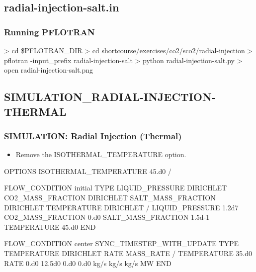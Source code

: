 \documentclass{beamer}
\newcommand\redcomment[1]{{{\color{red} #1}}}
\newcommand\greencomment[1]{{{\color{green} #1}}}
\begin{document}
\subsection{radial-injection-salt.in}

\begin{frame}[fragile]\frametitle{Running PFLOTRAN}

\begin{semiverbatim}

> cd \$PFLOTRAN_DIR
> cd shortcourse/exercises/co2/sco2/radial-injection
> pflotran -input_prefix radial-injection-salt
> python radial-injection-salt.py
> open radial-injection-salt.png
\end{semiverbatim}

\end{frame}

\subsection{SIMULATION\_RADIAL-INJECTION-THERMAL}

\begin{frame}\frametitle{SIMULATION: Radial Injection (Thermal)}

\begin{semiverbatim}

\begin{itemize}
\item Remove the ISOTHERMAL\_TEMPERATURE option.
\end{itemize}

  \redcomment{OPTIONS}
    \redcomment{ISOTHERMAL_TEMPERATURE 45.d0}
  \redcomment{/}

\newpage
FLOW_CONDITION initial
  TYPE
    LIQUID_PRESSURE DIRICHLET
    CO2_MASS_FRACTION DIRICHLET
    SALT_MASS_FRACTION DIRICHLET
    \greencomment{TEMPERATURE DIRICHLET}
  /
  LIQUID_PRESSURE 1.2d7
  CO2_MASS_FRACTION 0.d0
  SALT_MASS_FRACTION 1.5d-1
  \greencomment{TEMPERATURE 45.d0}
END

\newpage
FLOW_CONDITION center
  SYNC_TIMESTEP_WITH_UPDATE
  TYPE
    TEMPERATURE DIRICHLET
    RATE MASS_RATE
  /
  \greencomment{TEMPERATURE 35.d0}
  RATE 0.d0 12.5d0 0.d0 \greencomment{0.d0} kg/s kg/s kg/s \greencomment{MW}
END
\end{semiverbatim}

\end{frame}
\end{document}
